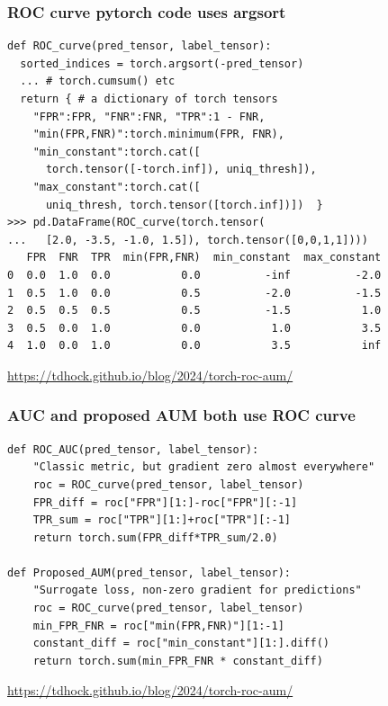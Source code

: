\documentclass[t]{beamer}
\begin{document}
\begin{frame}[fragile]
  \frametitle{ROC curve pytorch code uses argsort}
\small
  \begin{verbatim}
def ROC_curve(pred_tensor, label_tensor):
  sorted_indices = torch.argsort(-pred_tensor)
  ... # torch.cumsum() etc
  return { # a dictionary of torch tensors
    "FPR":FPR, "FNR":FNR, "TPR":1 - FNR,
    "min(FPR,FNR)":torch.minimum(FPR, FNR),
    "min_constant":torch.cat([
      torch.tensor([-torch.inf]), uniq_thresh]),
    "max_constant":torch.cat([
      uniq_thresh, torch.tensor([torch.inf])])  }
>>> pd.DataFrame(ROC_curve(torch.tensor(
...   [2.0, -3.5, -1.0, 1.5]), torch.tensor([0,0,1,1])))
   FPR  FNR  TPR  min(FPR,FNR)  min_constant  max_constant
0  0.0  1.0  0.0           0.0          -inf          -2.0
1  0.5  1.0  0.0           0.5          -2.0          -1.5
2  0.5  0.5  0.5           0.5          -1.5           1.0
3  0.5  0.0  1.0           0.0           1.0           3.5
4  1.0  0.0  1.0           0.0           3.5           inf
\end{verbatim}

    \url{https://tdhock.github.io/blog/2024/torch-roc-aum/}

\end{frame}


\begin{frame}[fragile]
  \frametitle{AUC and proposed AUM both use ROC curve}

  \begin{verbatim}
def ROC_AUC(pred_tensor, label_tensor):
    "Classic metric, but gradient zero almost everywhere"
    roc = ROC_curve(pred_tensor, label_tensor)
    FPR_diff = roc["FPR"][1:]-roc["FPR"][:-1]
    TPR_sum = roc["TPR"][1:]+roc["TPR"][:-1]
    return torch.sum(FPR_diff*TPR_sum/2.0)

def Proposed_AUM(pred_tensor, label_tensor):
    "Surrogate loss, non-zero gradient for predictions"
    roc = ROC_curve(pred_tensor, label_tensor)
    min_FPR_FNR = roc["min(FPR,FNR)"][1:-1]
    constant_diff = roc["min_constant"][1:].diff()
    return torch.sum(min_FPR_FNR * constant_diff)
\end{verbatim}

  \url{https://tdhock.github.io/blog/2024/torch-roc-aum/}
\end{frame}
\end{document}
